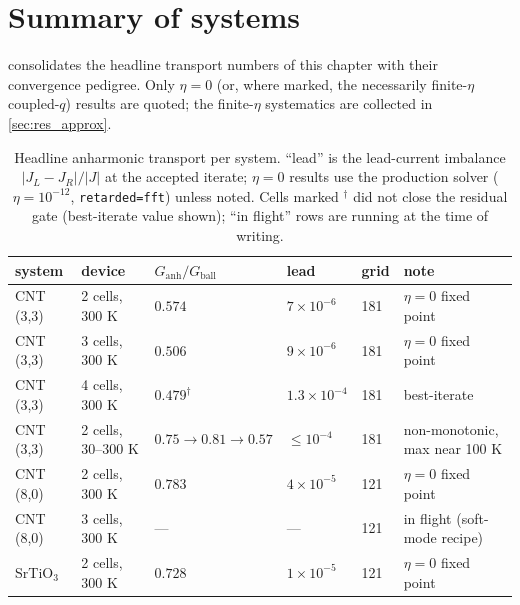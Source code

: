 \section{Summary of systems}
\label{sec:res_summary}

 consolidates the headline transport numbers of this
chapter with their convergence pedigree. Only $\eta=0$ (or, where marked, the
necessarily finite-$\eta$ coupled-$q$) results are quoted; the finite-$\eta$
systematics are collected in \cref{sec:res_approx}.

\begin{table}[htb]
  \centering
  \caption{Headline anharmonic transport per system. ``lead'' is the
  lead-current imbalance $|J_L-J_R|/|J|$ at the accepted iterate; $\eta=0$
  results use the production solver ($\eta=10^{-12}$, \texttt{retarded=fft})
  unless noted. Cells marked $^\dagger$ did not close the residual gate
  (best-iterate value shown); ``in flight'' rows are running at the time of
  writing.}
  \label{tab:res_summary}
  \begin{tabular}{llllll}
    \hline
    system & device & $G_\mathrm{anh}/G_\mathrm{ball}$ & lead & grid & note \\
    \hline
    CNT (3,3) & 2 cells, 300 K & $0.574$ & $7\times10^{-6}$ & 181 & $\eta=0$ fixed point \\
    CNT (3,3) & 3 cells, 300 K & $0.506$ & $9\times10^{-6}$ & 181 & $\eta=0$ fixed point \\
    CNT (3,3) & 4 cells, 300 K & $0.479^\dagger$ & $1.3\times10^{-4}$ & 181 & best-iterate \\
    CNT (3,3) & 2 cells, 30--300 K & $0.75\to0.81\to0.57$ & $\le10^{-4}$ & 181 & non-monotonic, max near 100 K \\
    CNT (8,0) & 2 cells, 300 K & $0.783$ & $4\times10^{-5}$ & 121 & $\eta=0$ fixed point \\
    CNT (8,0) & 3 cells, 300 K & --- & --- & 121 & in flight (soft-mode recipe) \\
    SrTiO$_3$ & 2 cells, 300 K & $0.728$ & $1\times10^{-5}$ & 121 & $\eta=0$ fixed point \\

\end{tabular}
\end{table}
